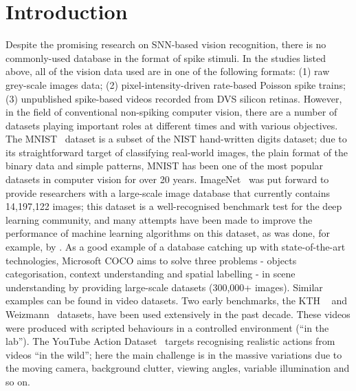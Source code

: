 \section{Introduction}
Despite the promising research on SNN-based vision recognition, there is no commonly-used database in the format of spike stimuli.
In the studies listed above, all of the vision data used are in one of the following formats:
(1) raw grey-scale images data;
(2) pixel-intensity-driven rate-based Poisson spike trains;
(3) unpublished spike-based videos recorded from DVS silicon retinas.
However, in the field of conventional non-spiking computer vision, there are a number of datasets playing important roles at different times and with various objectives.
The MNIST~\cite{lecun1998gradient} dataset is a subset of the NIST hand-written digits dataset; due to its straightforward target of classifying real-world images, the plain format of the binary data and simple patterns, MNIST has been one of the most popular datasets in computer vision for over 20 years.
ImageNet~\cite{deng2009imagenet} was put forward to provide researchers with a large-scale image database that currently contains 14,197,122 images;
this dataset is a well-recognised benchmark test for the deep learning community, and many attempts have been made to improve the performance of machine learning algorithms on this dataset, as was done, for example, by \cite{krizhevsky2012imagenet}.
As a good example of a database catching up with state-of-the-art technologies, Microsoft COCO aims to solve three problems - objects categorisation, context understanding and spatial labelling - in scene understanding by providing large-scale datasets (300,000+ images).
Similar examples can be found in video datasets.
Two early benchmarks, the KTH ~\cite{schuldt2004recognizing} and Weizmann~\cite{blank2005actions} datasets, have been used extensively in the past decade. 
These videos were produced with scripted behaviours in a controlled environment (``in the lab'').
The YouTube Action Dataset~\cite{liu2009recognizing} targets recognising realistic actions from videos ``in the wild'';
here the main challenge is in the massive variations due to the moving camera, background clutter, viewing angles, variable illumination and so on.

